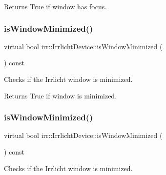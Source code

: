 \begin{DoxyReturn}{Returns}
True if window has focus. 
\end{DoxyReturn}
\mbox{\label{classirr_1_1IrrlichtDevice_a69e96b9c49c65391e406377a92e795b1}} 
\subsubsection{\texorpdfstring{is\+Window\+Minimized()}{isWindowMinimized()}\hspace{0.1cm}{\footnotesize\ttfamily [1/3]}}
{\footnotesize\ttfamily virtual bool irr\+::\+Irrlicht\+Device\+::is\+Window\+Minimized (\begin{DoxyParamCaption}{ }\end{DoxyParamCaption}) const\hspace{0.3cm}{\ttfamily [pure virtual]}}



Checks if the Irrlicht window is minimized. 

\begin{DoxyReturn}{Returns}
True if window is minimized. 
\end{DoxyReturn}
\mbox{\label{classirr_1_1IrrlichtDevice_a69e96b9c49c65391e406377a92e795b1}} 
\subsubsection{\texorpdfstring{is\+Window\+Minimized()}{isWindowMinimized()}\hspace{0.1cm}{\footnotesize\ttfamily [2/3]}}
{\footnotesize\ttfamily virtual bool irr\+::\+Irrlicht\+Device\+::is\+Window\+Minimized (\begin{DoxyParamCaption}{ }\end{DoxyParamCaption}) const\hspace{0.3cm}{\ttfamily [pure virtual]}}



Checks if the Irrlicht window is minimized. 

